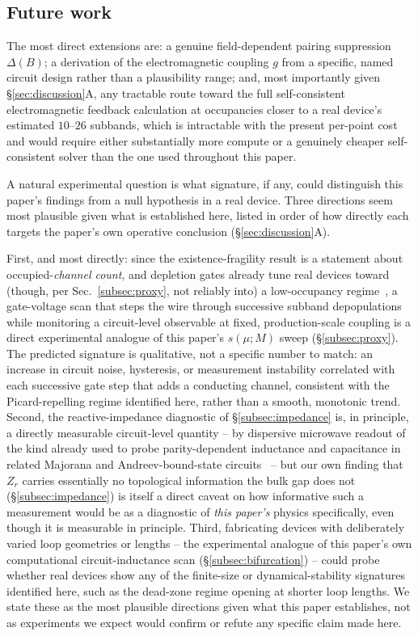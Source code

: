 \documentclass[aps,physrev,reprint,superscriptaddress,amsmath,amssymb,floatfix]{revtex4-2}
\begin{document}
\subsection{Future work}

The most direct extensions are: a genuine field-dependent pairing
suppression $\Delta(B)$; a derivation of the electromagnetic coupling $g$
from a specific, named circuit design rather than a plausibility range;
and, most importantly given \S\ref{sec:discussion}A, any tractable route
toward the full self-consistent electromagnetic feedback calculation at
occupancies closer to a real device's estimated $10$--$26$ subbands,
which is intractable with the present per-point cost and would require
either substantially more compute or a genuinely cheaper self-consistent
solver than the one used throughout this paper.

A natural experimental question is what signature, if any, could
distinguish this paper's findings from a null hypothesis in a real
device. Three directions seem most plausible given what is established
here, listed in order of how directly each targets the paper's own
operative conclusion (\S\ref{sec:discussion}A).

First, and most directly: since the existence-fragility result is a
statement about occupied-\emph{channel count}, and depletion gates
already tune real devices toward (though, per Sec.~\ref{subsec:proxy}, not
reliably into) a low-occupancy regime~\cite{mikkelsen2018hybridization,winkler2019unified},
a gate-voltage scan that steps the wire through successive subband
depopulations while monitoring a circuit-level observable at fixed,
production-scale coupling is a direct experimental analogue of this
paper's $s(\mu;M)$ sweep (\S\ref{subsec:proxy}). The predicted signature is
qualitative, not a specific number to match: an increase in circuit
noise, hysteresis, or measurement instability correlated with each
successive gate step that adds a conducting channel, consistent with the
Picard-repelling regime identified here, rather than a smooth, monotonic
trend. Second, the reactive-impedance diagnostic of
\S\ref{subsec:impedance} is, in principle, a directly measurable
circuit-level quantity -- by dispersive microwave readout of the kind
already used to probe parity-dependent inductance and capacitance in
related Majorana and Andreev-bound-state
circuits~\cite{ginossar2014microwave,roy2026inductance} -- but our own
finding that $Z_r$ carries essentially no topological information the
bulk gap does not (\S\ref{subsec:impedance}) is itself a direct caveat on
how informative such a measurement would be as a diagnostic of \emph{this
paper's} physics specifically, even though it is measurable in principle.
Third, fabricating devices with deliberately varied loop geometries or
lengths -- the experimental analogue of this paper's own computational
circuit-inductance scan (\S\ref{subsec:bifurcation}) -- could probe
whether real devices show any of the finite-size or dynamical-stability
signatures identified here, such as the dead-zone regime opening at
shorter loop lengths. We state these as the most plausible directions
given what this paper establishes, not as experiments we expect would
confirm or refute any specific claim made here.
\end{document}
